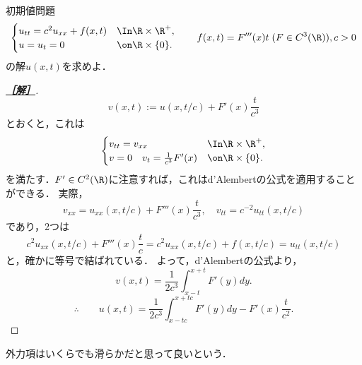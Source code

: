 \documentclass[uplatex,dvipdfmx]{jsarticle}
\begin{document}
\begin{problem}
    初期値問題
    \[\begin{cases}
        u_{tt}=c^2u_{xx}+f(x,t)&\In\R\times\R^+,\\
        u=u_t=0&\on\R\times\{0\}.
    \end{cases}\qquad f(x,t)=F'''(x)t\;(F\in C^3(\R)),c>0\]
    の解$u(x,t)$を求めよ．
\end{problem}
\begin{proof}[\bf\underline{［解］}]
    \[v(x,t):=u(x,t/c)+F'(x)\frac{t}{c^3}\]
    とおくと，これは
    \[\begin{cases}
        v_{tt}=v_{xx}&\In\R\times\R^+,\\
        v=0\quad v_t=\frac{1}{c^3}F'(x)&\on\R\times\{0\}.
    \end{cases}\]
    を満たす．$F'\in C^2(\R)$に注意すれば，これはd'Alembertの公式を適用することができる．
    実際，
    \[v_{xx}=u_{xx}(x,t/c)+F'''(x)\frac{t}{c^3},\quad v_{tt}=c^{-2}u_{tt}(x,t/c)\]
    であり，2つは
    \[c^2u_{xx}(x,t/c)+F'''(x)\frac{t}{c}=c^2u_{xx}(x,t/c)+f(x,t/c)=u_{tt}(x,t/c)\]
    と，確かに等号で結ばれている．
    よって，d'Alembertの公式より，
    \[v(x,t)=\frac{1}{2c^3}\int^{x+t}_{x-t}F'(y)dy.\]
    \[\therefore\qquad u(x,t)=\frac{1}{2c^3}\int^{x+tc}_{x-tc}F'(y)dy-F'(x)\frac{t}{c^2}.\]
\end{proof}
\begin{remarks}
    外力項はいくらでも滑らかだと思って良いという．
\end{remarks}
\end{document}
